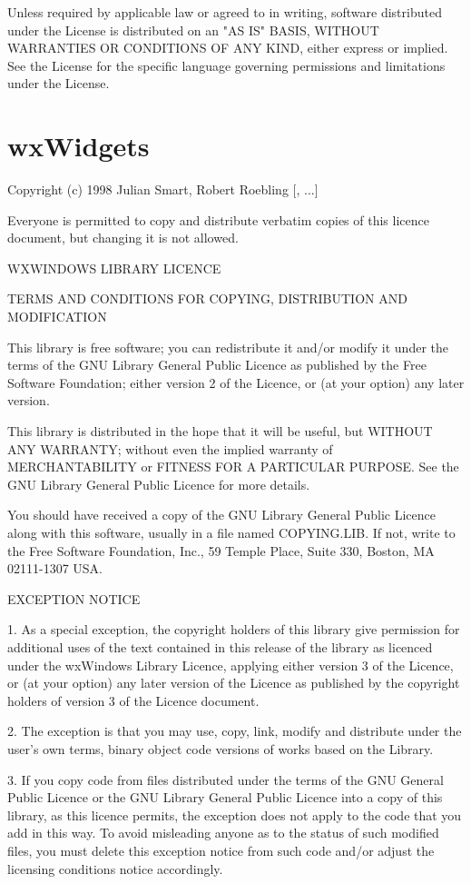 \documentclass[a4paper,twoside]{tceusermanual}
\begin{document}
   Unless required by applicable law or agreed to in writing, software
   distributed under the License is distributed on an "AS IS" BASIS,
   WITHOUT WARRANTIES OR CONDITIONS OF ANY KIND, either express or implied.
   See the License for the specific language governing permissions and
   limitations under the License.

\section{wxWidgets}

Copyright (c) 1998 Julian Smart, Robert Roebling [, ...]

Everyone is permitted to copy and distribute verbatim copies
of this licence document, but changing it is not allowed.

WXWINDOWS LIBRARY LICENCE

TERMS AND CONDITIONS FOR COPYING, DISTRIBUTION AND MODIFICATION

This library is free software; you can redistribute it and/or modify it
under the terms of the GNU Library General Public Licence as published by
the Free Software Foundation; either version 2 of the Licence, or (at
your option) any later version.

This library is distributed in the hope that it will be useful, but
WITHOUT ANY WARRANTY; without even the implied warranty of
MERCHANTABILITY or FITNESS FOR A PARTICULAR PURPOSE. See the GNU Library
General Public Licence for more details.

You should have received a copy of the GNU Library General Public Licence
along with this software, usually in a file named COPYING.LIB. If not,
write to the Free Software Foundation, Inc., 59 Temple Place, Suite 330,
Boston, MA 02111-1307 USA.

EXCEPTION NOTICE

1. As a special exception, the copyright holders of this library give
permission for additional uses of the text contained in this release of
the library as licenced under the wxWindows Library Licence, applying
either version 3 of the Licence, or (at your option) any later version of
the Licence as published by the copyright holders of version 3 of the
Licence document.

2. The exception is that you may use, copy, link, modify and distribute
under the user's own terms, binary object code versions of works based
on the Library.

3. If you copy code from files distributed under the terms of the GNU
General Public Licence or the GNU Library General Public Licence into a
copy of this library, as this licence permits, the exception does not
apply to the code that you add in this way. To avoid misleading anyone as
to the status of such modified files, you must delete this exception
notice from such code and/or adjust the licensing conditions notice
accordingly.
\end{document}
